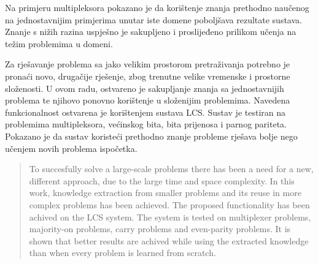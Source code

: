 \documentclass[times, utf8, zavrsni]{fer}
\begin{document}
Na primjeru multipleksora pokazano je da korištenje znanja prethodno naučenog na jednostavnijim primjerima unutar iste domene poboljšava rezultate sustava.
Znanje s nižih razina uspješno je sakupljeno i proslijeđeno prilikom učenja na težim problemima u domeni.




\begin{sazetak}
Za rješavanje problema sa jako velikim prostorom pretraživanja potrebno je pronaći novo, drugačije rješenje, zbog trenutne velike vremenske i prostorne složenosti.
U ovom radu, ostvareno je sakupljanje znanja sa jednostavnijih problema te njihovo ponovno korištenje u složenijim problemima.
Navedena funkcionalnost ostvarena je korištenjem sustava LCS.
Sustav je testiran na problemima multipleksora, većinskog bita, bita prijenosa i parnog pariteta.
Pokazano je da sustav koristeći prethodno znanje probleme rješava bolje nego učenjem novih problema ispočetka.

\end{sazetak}

\begin{abstract}
To succesfully solve a large-scale problems there has been a need for a new, different approach, due to the large time and space complexity.
In this work, knowledge extraction from smaller problems and its reuse in more complex problems has been achieved.
The proposed functionality has been achived on the LCS system.
The system is tested on multiplexer problems, majority-on problems, carry problems and even-parity problems.
It is shown that better results are achived while using the extracted knowledge than when every problem is learned from scratch.


\end{abstract}
\end{document}

